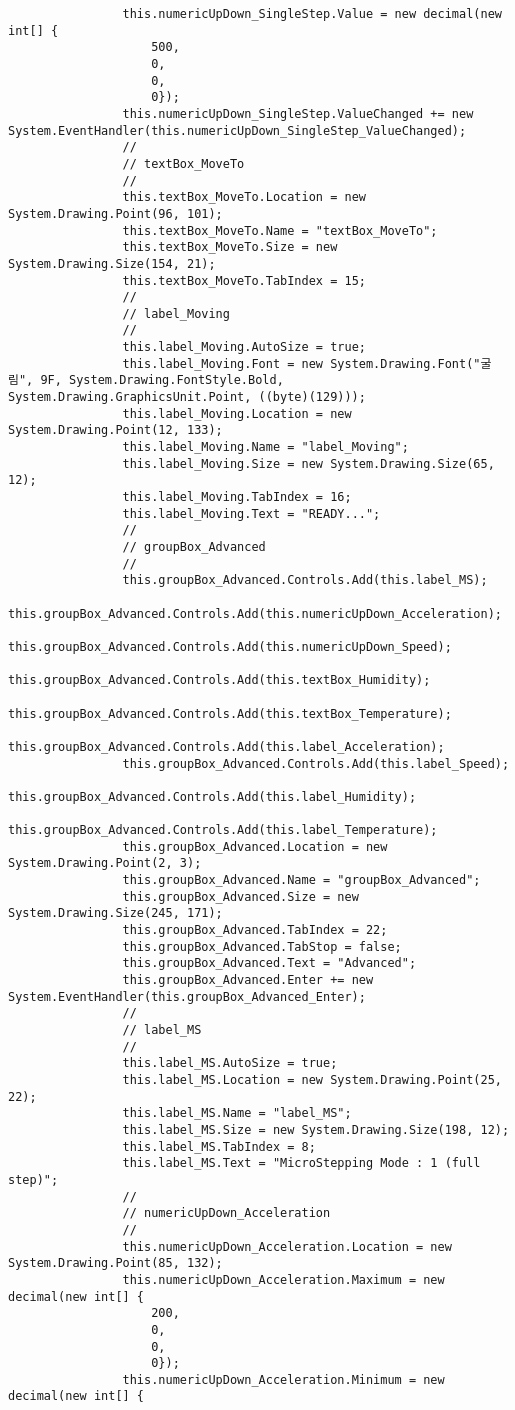 \begin{lstlisting}
				this.numericUpDown_SingleStep.Value = new decimal(new int[] {
					500,
					0,
					0,
					0});
				this.numericUpDown_SingleStep.ValueChanged += new System.EventHandler(this.numericUpDown_SingleStep_ValueChanged);
				// 
				// textBox_MoveTo
				// 
				this.textBox_MoveTo.Location = new System.Drawing.Point(96, 101);
				this.textBox_MoveTo.Name = "textBox_MoveTo";
				this.textBox_MoveTo.Size = new System.Drawing.Size(154, 21);
				this.textBox_MoveTo.TabIndex = 15;
				// 
				// label_Moving
				// 
				this.label_Moving.AutoSize = true;
				this.label_Moving.Font = new System.Drawing.Font("굴림", 9F, System.Drawing.FontStyle.Bold, System.Drawing.GraphicsUnit.Point, ((byte)(129)));
				this.label_Moving.Location = new System.Drawing.Point(12, 133);
				this.label_Moving.Name = "label_Moving";
				this.label_Moving.Size = new System.Drawing.Size(65, 12);
				this.label_Moving.TabIndex = 16;
				this.label_Moving.Text = "READY...";
				// 
				// groupBox_Advanced
				// 
				this.groupBox_Advanced.Controls.Add(this.label_MS);
				this.groupBox_Advanced.Controls.Add(this.numericUpDown_Acceleration);
				this.groupBox_Advanced.Controls.Add(this.numericUpDown_Speed);
				this.groupBox_Advanced.Controls.Add(this.textBox_Humidity);
				this.groupBox_Advanced.Controls.Add(this.textBox_Temperature);
				this.groupBox_Advanced.Controls.Add(this.label_Acceleration);
				this.groupBox_Advanced.Controls.Add(this.label_Speed);
				this.groupBox_Advanced.Controls.Add(this.label_Humidity);
				this.groupBox_Advanced.Controls.Add(this.label_Temperature);
				this.groupBox_Advanced.Location = new System.Drawing.Point(2, 3);
				this.groupBox_Advanced.Name = "groupBox_Advanced";
				this.groupBox_Advanced.Size = new System.Drawing.Size(245, 171);
				this.groupBox_Advanced.TabIndex = 22;
				this.groupBox_Advanced.TabStop = false;
				this.groupBox_Advanced.Text = "Advanced";
				this.groupBox_Advanced.Enter += new System.EventHandler(this.groupBox_Advanced_Enter);
				// 
				// label_MS
				// 
				this.label_MS.AutoSize = true;
				this.label_MS.Location = new System.Drawing.Point(25, 22);
				this.label_MS.Name = "label_MS";
				this.label_MS.Size = new System.Drawing.Size(198, 12);
				this.label_MS.TabIndex = 8;
				this.label_MS.Text = "MicroStepping Mode : 1 (full step)";
				// 
				// numericUpDown_Acceleration
				// 
				this.numericUpDown_Acceleration.Location = new System.Drawing.Point(85, 132);
				this.numericUpDown_Acceleration.Maximum = new decimal(new int[] {
					200,
					0,
					0,
					0});
				this.numericUpDown_Acceleration.Minimum = new decimal(new int[] {

\end{lstlisting}
